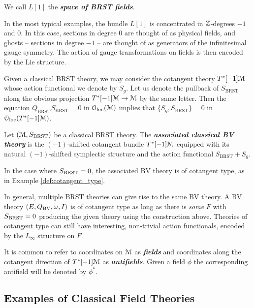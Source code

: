\documentclass[10pt, oneside]{article}
\newcommand{\defterm}[1]{\textbf{\emph{#1}}}
\begin{document}
We call $L[1]$ the \defterm{space of BRST fields}.

\begin{remark}
In the most typical examples, the bundle $L[1]$ is concentrated in $\mathbb Z$-degrees $-1$ and 0.  In this case, sections in degree 0 are thought of as physical fields, and ghosts -- sections in degree $-1$ -- are thought of as generators of the infinitesimal gauge symmetry.  The action of gauge transformations on fields is then encoded by the Lie structure.
\end{remark}

Given a classical BRST theory, we may consider the cotangent theory $T^*[-1]\mathcal M$ whose action functional we denote by $S_g$. Let us denote the pullback of $S_{\mathrm{BRST}}$ along the obvious projection $T^*[-1]\mathcal M\rightarrow \mathcal M$ by the same letter. Then the equation $Q_{\mathrm{BRST}} S_{\mathrm{BRST}} = 0$ in $\mathcal{O}_{\rm loc}(\mathcal M)$ implies that $\{S_g, S_{\mathrm{BRST}}\} = 0$ in $\mathcal{O}_{\rm loc}(T^*[-1]\mathcal M)$.

\begin{definition}
Let $(\mathcal M, S_{\mathrm{BRST}})$ be a classical BRST theory. The \defterm{associated classical BV theory} is the $(-1)$-shifted cotangent bundle $T^*[-1]\mathcal M$ equipped with its natural $(-1)$-shifted symplectic structure and the action functional $S_{\mathrm{BRST}} + S_g$.
\end{definition}

In the case where $S_{\mathrm{BRST}} = 0$, the associated BV theory is of cotangent type, as in Example \ref{def:cotangent_type}.

\begin{remark}
In general, multiple BRST theories can give rise to the same BV theory.  A BV theory $(E, Q_{\mathrm{BV}}, \omega, I)$ is of cotangent type as long as there is \emph{some} $F$ with $S_{\mathrm{BRST}} = 0$ producing the given theory using the construction above.  Theories of cotangent type can still have interesting, non-trivial action functionals, encoded by the $L_\infty$ structure on $F$.
\end{remark}

\begin{remark}
It is common to refer to coordinates on $\mathcal M$ as \defterm{fields} and coordinates along the cotangent direction of $T^*[-1]\mathcal M$ as \defterm{antifields}. Given a field $\phi$ the corresponding antifield will be denoted by $\phi^*$.
\end{remark}

\subsection{Examples of Classical Field Theories}
\end{document}
